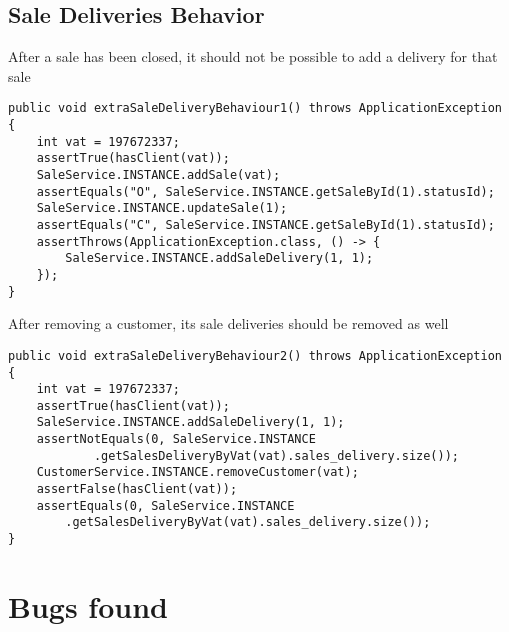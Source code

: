 \documentclass[12pt]{article}
\begin{document}
\subsection{Sale Deliveries Behavior}
After a sale has been closed, it should not be possible to add a delivery for that sale 
\begin{lstlisting}
public void extraSaleDeliveryBehaviour1() throws ApplicationException {
	int vat = 197672337;
	assertTrue(hasClient(vat));
	SaleService.INSTANCE.addSale(vat);
	assertEquals("O", SaleService.INSTANCE.getSaleById(1).statusId);
	SaleService.INSTANCE.updateSale(1);
	assertEquals("C", SaleService.INSTANCE.getSaleById(1).statusId);
	assertThrows(ApplicationException.class, () -> {
		SaleService.INSTANCE.addSaleDelivery(1, 1);
	});		
}
\end{lstlisting}

After removing a customer, its sale deliveries should be removed as well
\begin{lstlisting}
public void extraSaleDeliveryBehaviour2() throws ApplicationException {
	int vat = 197672337;
	assertTrue(hasClient(vat));
	SaleService.INSTANCE.addSaleDelivery(1, 1);
	assertNotEquals(0, SaleService.INSTANCE
			.getSalesDeliveryByVat(vat).sales_delivery.size());
	CustomerService.INSTANCE.removeCustomer(vat);
	assertFalse(hasClient(vat));
	assertEquals(0, SaleService.INSTANCE
		.getSalesDeliveryByVat(vat).sales_delivery.size());
}
\end{lstlisting}
\section{Bugs found}










\end{document}
